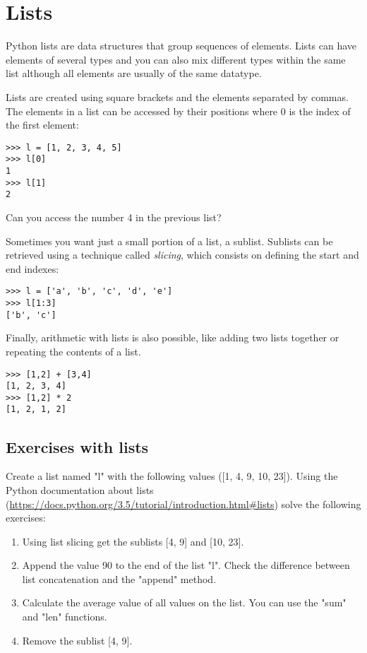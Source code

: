 \chapter{Lists}\label{lists}

Python lists are data structures that group sequences of elements. Lists can have elements of several types and you can also mix different types within the same list although all elements are usually of the same datatype. 

Lists are created using square brackets and the elements separated by commas. The elements in a list can be accessed by their positions where 0 is the index of the first element:

\begin{lstlisting}
>>> l = [1, 2, 3, 4, 5]
>>> l[0]
1
>>> l[1]
2
\end{lstlisting}

Can you access the number 4 in the previous list?

Sometimes you want just a small portion of a list, a sublist. Sublists can be retrieved using a technique called \textit{slicing}, which consists on defining the start and end indexes:

\begin{lstlisting}
>>> l = ['a', 'b', 'c', 'd', 'e']
>>> l[1:3]
['b', 'c']
\end{lstlisting}

Finally, arithmetic with lists is also possible, like adding two lists together or repeating the contents of a list.

\begin{lstlisting}
>>> [1,2] + [3,4]
[1, 2, 3, 4]
>>> [1,2] * 2
[1, 2, 1, 2]
\end{lstlisting}


\section{Exercises with lists}

Create a list named "l" with the following values ([1, 4, 9, 10, 23]). Using the Python documentation about lists (\url{https://docs.python.org/3.5/tutorial/introduction.html#lists}) solve the following exercises:

\begin{enumerate}

\item Using list slicing get the sublists [4, 9] and [10, 23].

\item Append the value 90 to the end of the list "l". Check the difference between list concatenation and the "append" method.

\item Calculate the average value of all values on the list. You can use the "sum" and "len" functions.

\item Remove the sublist [4, 9].

\end{enumerate}


